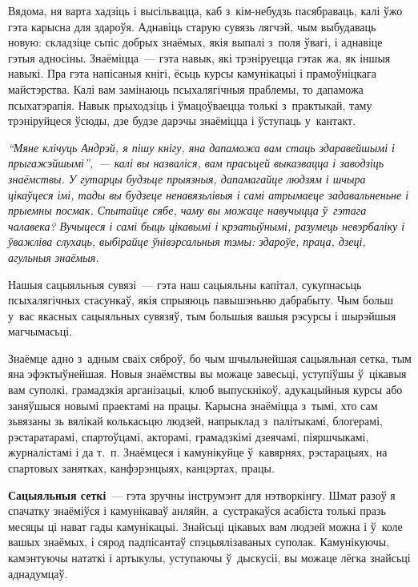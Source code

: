 Вядома, ня варта хадзіць і высільвацца, каб з~кім-небудзь пасябраваць, калі ўжо гэта карысна для здароўя. Аднавіць старую сувязь лягчэй, чым выбудаваць новую: складзіце сьпіс добрых знаёмых, якія выпалі з~поля ўвагі, і аднавіце гэтыя адносіны. Знаёміцца~--- гэта навык, які трэніруецца гэтак жа, як іншыя навыкі. Пра гэта напісаныя кнігі, ёсьць курсы камунікацыі і прамоўніцкага майстэрства. Калі вам замінаюць псыхалягічныя праблемы, то дапаможа псыхатэрапія. Навык прыходзіць і ўмацоўваецца толькі з~практыкай, таму трэніруйцеся ўсюды, дзе будзе дарэчы знаёміцца і ўступаць у~кантакт.

\emph{``Мяне клічуць Андрэй, я пішу кнігу, яна дапаможа вам стаць здаравейшымі і прыгажэйшымі'',~--- калі вы назваліся, вам прасьцей выказвацца і заводзіць знаёмствы. У гутарцы будзьце прыязныя, дапамагайце людзям і шчыра цікаўцеся імі, тады вы будзеце ненавязьлівыя і самі атрымаеце задавальненьне і прыемны посмак. Спытайце сябе, чаму вы можаце навучыцца ў~гэтага чалавека? Вучыцеся і самі быць цікавымі і крэатыўнымі, разумець невэрбаліку і ўважліва слухаць, выбірайце ўнівэрсальныя тэмы: здароўе, праца, дзеці, агульныя знаёмыя.}

Нашыя сацыяльныя сувязі~--- гэта наш сацыяльны капітал, сукупнасьць псыхалягічных стасункаў, якія спрыяюць павышэньню дабрабыту. Чым больш у~вас якасных сацыяльных сувязяў, тым большыя вашыя рэсурсы і шырэйшыя магчымасьці.


Знаёмце адно з~адным сваіх сяброў, бо чым шчыльнейшая сацыяльная сетка, тым яна эфэктыўнейшая. Новыя знаёмствы вы можаце завесьці, уступіўшы ў~цікавыя вам суполкі, грамадзкія арганізацыі, клюб выпускнікоў, адукацыйныя курсы або заняўшыся новымі праектамі на працы. Карысна знаёміцца з~тымі, хто сам зьвязаны зь вялікай колькасьцю людзей, напрыклад з~палітыкамі, блогерамі, рэстаратарамі, спартоўцамі, акторамі, грамадзкімі дзеячамі, піяршчыкамі, журналістамі і да т.~п. Знаёмцеся і камунікуйце ў~кавярнях, рэстарацыях, на спартовых занятках, канфэрэнцыях, канцэртах, працы.

\textbf{Сацыяльныя сеткі}~--- гэта зручны інструмэнт для нэтворкінгу. Шмат разоў я спачатку знаёміўся і камунікаваў анляйн, а~сустракаўся асабіста толькі празь месяцы ці нават гады камунікацыі. Знайсьці цікавых вам людзей можна і ў~коле вашых знаёмых, і сярод падпісантаў спэцыялізаваных суполак. Камунікуючы, камэнтуючы нататкі і артыкулы, уступаючы ў~дыскусіі, вы можаце лёгка знайсьці аднадумцаў.

